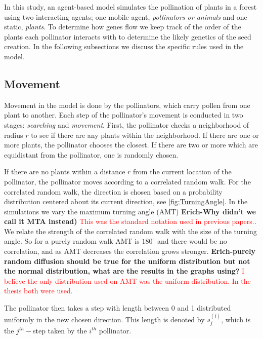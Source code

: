 In this study, an agent-based model simulates the pollination of plants in a
forest using two interacting agents; one mobile agent, \emph{pollinators or
animals} and one static, \emph{plants}.  To determine how genes flow we keep
track of the order of the plants each pollinator interacts with to determine the
likely genetics of the seed creation. In the following subsections we discuss
the specific rules used in the model.

\subsection{Movement}

Movement in the model is done by the pollinators, which carry pollen from one
plant to another.  Each step of the pollinator's movement is conducted in two
stages: \emph{searching} and \emph{movement}.  First, the pollinator checks a
neighborhood of radius $r$ to see if there are any plants within the
neighborhood.  If there are one or more plants, the pollinator chooses the
closest.  If there are two or more which are equidistant from the pollinator, one
is randomly chosen.

If there are no plants within a distance $r$ from the current location of the
pollinator, the pollinator moves according to a correlated random walk.  For the
correlated random walk, the direction is chosen based on a probability
distribution centered about its current direction, see
\cref{fig:TurningAngle}.  In the simulations we vary the maximum turning
angle (AMT) {\bf Erich-Why didn't we call it MTA instead)} \textcolor{red}{This
was the standard notation used in previous papers.}.  We relate the
strength of the correlated random walk with the size of the turning angle.  So
for a purely random walk AMT is $180^{\circ}$ and there would be no correlation,
and as AMT decreases the correlation grows stronger.
{\bf Erich-purely random diffusion should be true for the uniform distribution
but not the normal distribution, what are the results in the graphs using?}
\textcolor{red}{I believe the only distribution used on AMT was the uniform
distribution. In the thesis both were used.}

The pollinator then takes a step with length between 0 and 1 distributed
uniformly in the new chosen direction.  This length is denoted by $s_j^{(i)}$,
which is the $j^{th}-$step taken by the $i^{th}$ pollinator.

